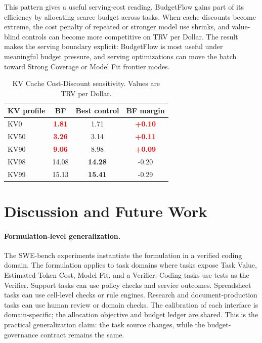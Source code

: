 \documentclass{article}
\newcommand{\method}{BudgetFlow\xspace}
\newcommand{\trv}{TRV\xspace}
\newcommand{\taskvalue}{Task Value\xspace}
\newcommand{\tokencost}{Estimated Token Cost\xspace}
\newcommand{\modelfit}{Model Fit\xspace}
\newcommand{\verifier}{Verifier\xspace}
\newcommand{\pos}[1]{\textcolor{red}{\textbf{#1}}}
\newcommand{\ctrl}[1]{\textcolor{bfblue}{\textbf{#1}}}
\begin{document}
This pattern gives a useful serving-cost reading. \method gains part of its efficiency by allocating scarce budget across tasks. When cache discounts become extreme, the cost penalty of repeated or stronger model use shrinks, and value-blind controls can become more competitive on \trv per Dollar. The result makes the serving boundary explicit: BudgetFlow is most useful under meaningful budget pressure, and serving optimizations can move the batch toward Strong Coverage or Model Fit frontier modes.

\begin{table}[t]
\centering
\small
\begin{tabular}{lccc}
\toprule
KV profile & BF & Best control & BF margin \\
\midrule
KV0 & \pos{1.81} & 1.71 & \pos{+0.10} \\
KV50 & \pos{3.26} & 3.14 & \pos{+0.11} \\
KV90 & \pos{9.06} & 8.98 & \pos{+0.09} \\
KV98 & 14.08 & \ctrl{14.28} & -0.20 \\
KV99 & 15.13 & \ctrl{15.41} & -0.29 \\
\bottomrule
\end{tabular}
\caption{KV Cache Cost-Discount sensitivity. Values are \trv per Dollar.}
\label{tab:kv-sensitivity}
\end{table}

\section{Discussion and Future Work}
\label{sec:discussion}
\paragraph{Formulation-level generalization.}
The SWE-bench experiments instantiate the formulation in a verified coding domain. The formulation applies to task domains where tasks expose \taskvalue, \tokencost, \modelfit, and a \verifier. Coding tasks use tests as the \verifier. Support tasks can use policy checks and service outcomes. Spreadsheet tasks can use cell-level checks or rule engines. Research and document-production tasks can use human review or domain checks. The calibration of each interface is domain-specific; the allocation objective and budget ledger are shared. This is the practical generalization claim: the task source changes, while the budget-governance contract remains the same.
\end{document}
